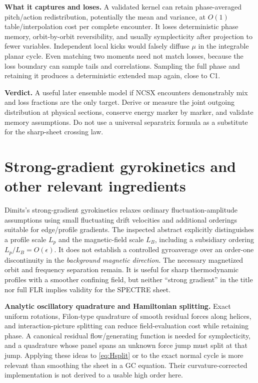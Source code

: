 \documentclass[10pt,a4paper]{article}
\begin{document}
\textbf{What it captures and loses.} A validated kernel can retain phase-averaged pitch/action redistribution, potentially the mean and variance, at $O(1)$ table/interpolation cost per complete encounter. It loses deterministic phase memory, orbit-by-orbit reversibility, and usually symplecticity after projection to fewer variables. Independent local kicks would falsely diffuse $\mu$ in the integrable planar cycle. Even matching two moments need not match losses, because the loss boundary can sample tails and correlations. Sampling the full phase and retaining it produces a deterministic extended map again, close to C1.

\textbf{Verdict.} A useful later ensemble model if NCSX encounters demonstrably mix and loss fractions are the only target. Derive or measure the joint outgoing distribution at physical sections, conserve energy marker by marker, and validate memory assumptions. Do not use a universal separatrix formula as a substitute for the sharp-sheet crossing law.

\section{Strong-gradient gyrokinetics and other relevant ingredients}
\label{sec:other}
Dimits's strong-gradient gyrokinetics \cite{dimits} relaxes ordinary fluctuation-amplitude assumptions using small fluctuating drift velocities and additional orderings suitable for edge/profile gradients. The inspected abstract explicitly distinguishes a profile scale $L_p$ and the magnetic-field scale $L_B$, including a subsidiary ordering $L_p/L_B=O(\epsilon)$. It does not establish a controlled gyroaverage over an order-one discontinuity in the \emph{background magnetic direction}. The necessary magnetized orbit and frequency separation remain. It is useful for sharp thermodynamic profiles with a smoother confining field, but neither ``strong gradient'' in the title nor full FLR implies validity for the SPECTRE sheet.

\textbf{Analytic oscillatory quadrature and Hamiltonian splitting.} Exact uniform rotations, Filon-type quadrature of smooth residual forces along helices, and interaction-picture splitting can reduce field-evaluation cost while retaining phase. A canonical residual flow/generating function is needed for symplecticity, and a quadrature whose panel spans an unknown force jump must split at that jump. Applying these ideas to \eqref{eq:Hsplit} or to the exact normal cycle is more relevant than smoothing the sheet in a GC equation. Their curvature-corrected implementation is not derived to a usable high order here.
\end{document}
